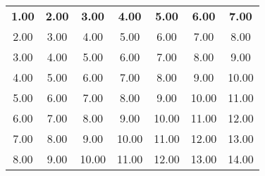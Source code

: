 \begin{tabular}{c|c|c|c|c|c|c|}
\textbf{1.00} & \textbf{2.00} & \textbf{3.00} & \textbf{4.00} & \textbf{5.00} & \textbf{6.00} & \textbf{7.00}\\
2.00 & 3.00 & 4.00 & 5.00 & 6.00 & 7.00 & 8.00\\
3.00 & 4.00 & 5.00 & 6.00 & 7.00 & 8.00 & 9.00\\
4.00 & 5.00 & 6.00 & 7.00 & 8.00 & 9.00 & 10.00\\
5.00 & 6.00 & 7.00 & 8.00 & 9.00 & 10.00 & 11.00\\
6.00 & 7.00 & 8.00 & 9.00 & 10.00 & 11.00 & 12.00\\
7.00 & 8.00 & 9.00 & 10.00 & 11.00 & 12.00 & 13.00\\
8.00 & 9.00 & 10.00 & 11.00 & 12.00 & 13.00 & 14.00
\end{tabular}